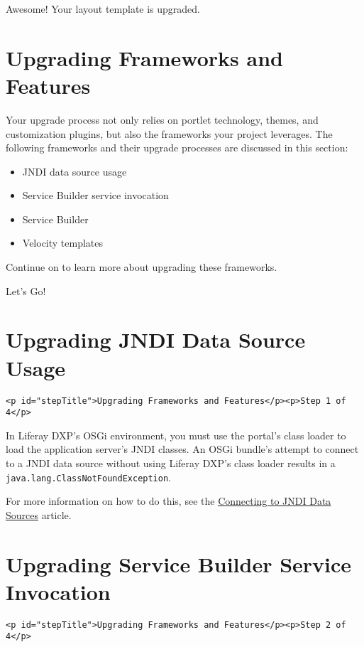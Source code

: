 Awesome! Your layout template is upgraded.

\chapter{Upgrading Frameworks and
Features}\label{upgrading-frameworks-and-features}

Your upgrade process not only relies on portlet technology, themes, and
customization plugins, but also the frameworks your project leverages.
The following frameworks and their upgrade processes are discussed in
this section:

\begin{itemize}
\tightlist
\item
  JNDI data source usage
\item
  Service Builder service invocation
\item
  Service Builder
\item
  Velocity templates
\end{itemize}

Continue on to learn more about upgrading these frameworks.

Let's Go!{}

\chapter{Upgrading JNDI Data Source
Usage}\label{upgrading-jndi-data-source-usage}

\begin{verbatim}
<p id="stepTitle">Upgrading Frameworks and Features</p><p>Step 1 of 4</p>
\end{verbatim}

In Liferay DXP's OSGi environment, you must use the portal's class
loader to load the application server's JNDI classes. An OSGi bundle's
attempt to connect to a JNDI data source without using Liferay DXP's
class loader results in a \texttt{java.lang.ClassNotFoundException}.

For more information on how to do this, see the
\href{/docs/7-2/appdev/-/knowledge_base/a/connecting-to-data-sources-using-jndi}{Connecting
to JNDI Data Sources} article.

\chapter{Upgrading Service Builder Service
Invocation}\label{upgrading-service-builder-service-invocation}

\begin{verbatim}
<p id="stepTitle">Upgrading Frameworks and Features</p><p>Step 2 of 4</p>
\end{verbatim}


